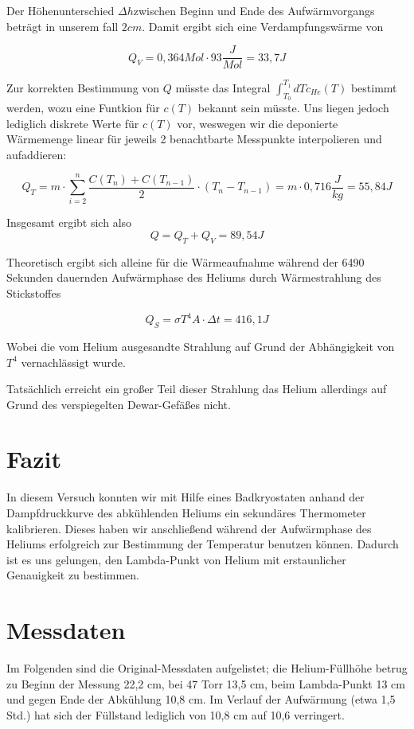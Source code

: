 \documentclass[bigchapter,colorback,accentcolor=tud4b,linedtoc,11pt]{tudreport}
\begin{document}
Der Höhenunterschied $\Delta h$zwischen Beginn und Ende des Aufwärmvorgangs
beträgt in unserem fall $2 cm$. Damit ergibt sich eine Verdampfungswärme von 

$$Q_V = 0,364 Mol \cdot 93\frac{J}{Mol} = 33,7J$$

Zur korrekten Bestimmung von $Q$ müsste das Integral $\int_{T_0}^{T_1}dT
c_{He}(T)$ bestimmt werden, wozu eine Funtkion für $c(T)$ bekannt sein
müsste. Uns liegen jedoch lediglich diskrete Werte für $c(T)$ vor, weswegen wir die
deponierte Wärmemenge linear für jeweils 2 benachtbarte Messpunkte interpolieren
und aufaddieren:

$$Q_T = m \cdot \sum \limits_{i=2}^n \frac{C(T_n) + C(T_{n-1})}{2} \cdot (T_n -
  T_{n-1}) = m \cdot 0,716 \frac{J}{kg} = 55,84 J$$

Insgesamt ergibt sich also 
$$Q = Q_T + Q_V = 89,54J$$

Theoretisch ergibt sich alleine für die Wärmeaufnahme während der 6490 Sekunden
dauernden Aufwärmphase des Heliums durch Wärmestrahlung des Stickstoffes

$$Q_S = \sigma T^4 A \cdot \Delta t = 416,1J$$

Wobei die vom Helium ausgesandte Strahlung auf Grund der Abhängigkeit von $T^4$
vernachlässigt wurde.

Tatsächlich erreicht ein großer Teil dieser Strahlung das Helium allerdings auf
Grund des verspiegelten Dewar-Gefäßes nicht.

\chapter{Fazit}
In diesem Versuch konnten wir mit Hilfe eines Badkryostaten anhand der
Dampfdruckkurve des abkühlenden Heliums ein sekundäres Thermometer kalibrieren. Dieses haben
wir anschließend während der Aufwärmphase des Heliums erfolgreich zur Bestimmung
der Temperatur benutzen können. Dadurch ist es uns gelungen, den
Lambda-Punkt von Helium mit erstaunlicher Genauigkeit zu bestimmen.

\chapter{Messdaten}

Im Folgenden sind die Original-Messdaten aufgelistet; die Helium-Füllhöhe betrug zu Beginn der Messung 22,2 cm, bei 47 Torr 13,5 cm, beim Lambda-Punkt 13 cm und gegen Ende der Abkühlung 10,8 cm. Im Verlauf der Aufwärmung (etwa 1,5 Std.) hat sich der Füllstand lediglich von 10,8 cm auf 10,6 verringert.
\end{document}
